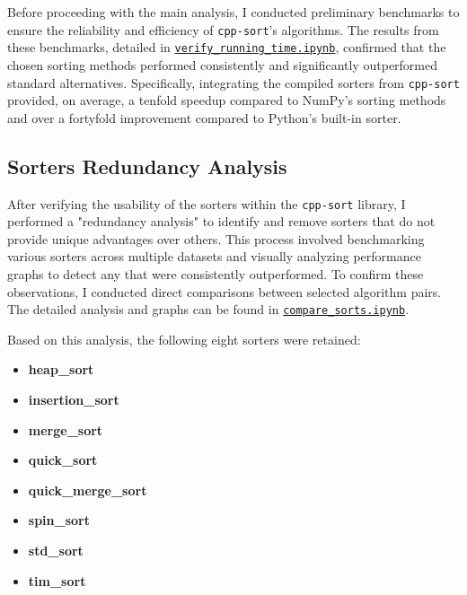 \documentclass[twocolumn]{article}
\begin{document}
Before proceeding with the main analysis, I conducted preliminary benchmarks to ensure the reliability and efficiency of \texttt{cpp-sort}'s algorithms. The results from these benchmarks, detailed in \href{https://github.com/kiselevart/sorting-selector/blob/main/Implementation/analysis/verify_running_time.ipynb}{\texttt{verify\_running\_time.ipynb}}, confirmed that the chosen sorting methods performed consistently and significantly outperformed standard alternatives. Specifically, integrating the compiled sorters from \texttt{cpp-sort} provided, on average, a tenfold speedup compared to NumPy's sorting methods and over a fortyfold improvement compared to Python's built-in sorter.

\subsection{Sorters Redundancy Analysis}

After verifying the usability of the sorters within the \texttt{cpp-sort} library, I performed a "redundancy analysis" to identify and remove sorters that do not provide unique advantages over others. This process involved benchmarking various sorters across multiple datasets and visually analyzing performance graphs to detect any that were consistently outperformed. To confirm these observations, I conducted direct comparisons between selected algorithm pairs. The detailed analysis and graphs can be found in \href{https://github.com/kiselevart/sorting-selector/blob/main/Implementation/analysis/compare_sorts.ipynb}{\texttt{compare\_sorts.ipynb}}.

Based on this analysis, the following eight sorters were retained:
\begin{multicols}{2}
\begin{itemize}[itemsep=0.05em, topsep=0pt]
    \item \textbf{heap\_sort}
    \item \textbf{insertion\_sort}
    \item \textbf{merge\_sort}
    \item \textbf{quick\_sort}
    \item \textbf{quick\_merge\_sort}
    \item \textbf{spin\_sort}
    \item \textbf{std\_sort}
    \item \textbf{tim\_sort}
\end{itemize}
\end{multicols}
\end{document}
